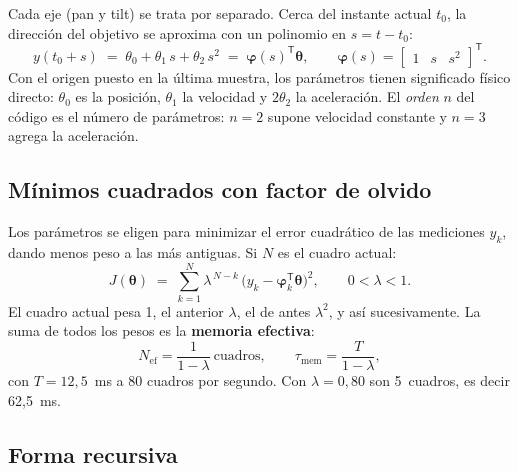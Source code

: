 \documentclass[11pt,a4paper]{article}
\newcommand{\lam}{\lambda}
\begin{document}
Cada eje (pan y tilt) se trata por separado. Cerca del instante actual $t_0$, la dirección del objetivo se
aproxima con un polinomio en $s = t - t_0$:
\begin{equation}
  y(t_0 + s) \;=\; \theta_0 + \theta_1\, s + \theta_2\, s^2 \;=\; \boldsymbol{\varphi}(s)^{\mathsf T}\boldsymbol{\theta},
  \qquad \boldsymbol{\varphi}(s) = \begin{bmatrix} 1 & s & s^2 \end{bmatrix}^{\mathsf T}.
  \label{eq:modelo}
\end{equation}
Con el origen puesto en la última muestra, los parámetros tienen significado físico directo: $\theta_0$ es la
posición, $\theta_1$ la velocidad y $2\theta_2$ la aceleración. El \emph{orden} $n$ del código es el número de
parámetros: $n = 2$ supone velocidad constante y $n = 3$ agrega la aceleración.

\subsection{Mínimos cuadrados con factor de olvido}

Los parámetros se eligen para minimizar el error cuadrático de las mediciones $y_k$, dando menos peso a las
más antiguas. Si $N$ es el cuadro actual:
\begin{equation}
  J(\boldsymbol{\theta}) \;=\; \sum_{k=1}^{N} \lam^{\,N-k}\,\bigl(y_k - \boldsymbol{\varphi}_k^{\mathsf T}\boldsymbol{\theta}\bigr)^2,
  \qquad 0 < \lam < 1 .
  \label{eq:costo}
\end{equation}
El cuadro actual pesa 1, el anterior $\lam$, el de antes $\lam^2$, y así sucesivamente. La suma de todos los
pesos es la \textbf{memoria efectiva}:
\begin{equation}
  N_{\mathrm{ef}} = \frac{1}{1-\lam}\ \text{cuadros}, \qquad \tau_{\mathrm{mem}} = \frac{T}{1-\lam},
  \label{eq:memoria}
\end{equation}
con $T = 12{,}5$~ms a 80 cuadros por segundo. Con $\lam = 0{,}80$ son 5~cuadros, es decir 62,5~ms.

\subsection{Forma recursiva}
\end{document}
